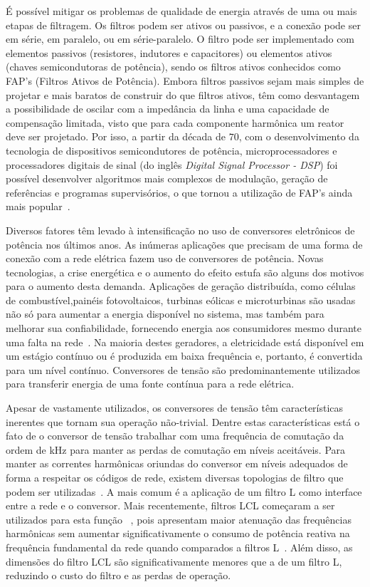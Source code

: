 	É possível mitigar os problemas de qualidade de energia através de uma ou mais etapas de filtragem. Os filtros podem ser ativos ou passivos, e a conexão pode ser em série, em paralelo, ou em série-paralelo. O filtro pode ser implementado com elementos passivos (resistores, indutores e capacitores) ou elementos ativos (chaves semicondutoras de potência), sendo os filtros ativos conhecidos como FAP's (Filtros Ativos de Potência). Embora filtros passivos sejam mais simples de projetar e mais baratos de construir do que filtros ativos, têm como desvantagem a possibilidade de oscilar com a impedância da linha e uma capacidade de compensação limitada, visto que para cada componente harmônica um reator deve ser projetado. Por isso, a partir da década de $70$, com o desenvolvimento da tecnologia de dispositivos semicondutores de potência, microprocessadores e processadores digitais de sinal (do inglês \emph{Digital Signal Processor - DSP}) foi possível desenvolver algoritmos mais complexos de modulação, geração de referências e programas supervisórios, o que tornou a utilização de FAP's ainda mais popular~\cite{ref:SASAKI}.

	Diversos fatores têm levado à intensificação no uso de conversores eletrônicos de potência nos últimos anos. As inúmeras aplicações que precisam de uma forma de conexão com a rede elétrica fazem uso de conversores de potência. Novas tecnologias, a crise energética e o aumento do efeito estufa são alguns dos motivos para o aumento desta demanda. Aplicações de geração distribuída, como células de combustível,painéis fotovoltaicos, turbinas eólicas e microturbinas são usadas não só para aumentar a energia disponível no sistema, mas também para melhorar sua confiabilidade, fornecendo energia aos consumidores mesmo durante uma falta na rede~\cite{ref:KARSHENAS}.	Na maioria destes geradores, a eletricidade está disponível em um estágio contínuo ou é produzida em baixa frequência e, portanto, é convertida para um nível contínuo. Conversores de tensão são predominantemente utilizados para transferir energia de uma fonte contínua para a rede elétrica.

	Apesar de vastamente utilizados, os conversores de tensão têm características inerentes que tornam sua operação não-trivial. Dentre estas características está o fato de o conversor de tensão trabalhar com uma frequência de comutação da ordem de kHz para manter as perdas de comutação em níveis aceitáveis. Para manter as correntes harmônicas oriundas do conversor em níveis adequados de forma a respeitar os códigos de rede, existem diversas topologias de filtro que podem ser utilizadas~\cite{ref:RIBEIRO}. A mais comum é a aplicação de um filtro L como interface entre a rede e o conversor. Mais recentemente, filtros LCL começaram a ser utilizados para esta função~\cite{ref:LINDGREN}\cite{ref:TEODORESCU} \cite{ref:XU}, pois apresentam maior atenuação das frequências harmônicas sem aumentar significativamente o consumo de potência reativa na frequência fundamental da rede quando comparados a filtros L~\cite{ref:FUCHS}. Além disso, as dimensões do filtro LCL são significativamente menores que a de um filtro L, reduzindo o custo do filtro e as perdas de operação.

